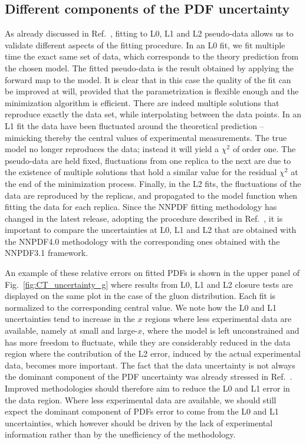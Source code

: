 \subsection{Different components of the PDF uncertainty}

As already discussed in Ref.~\cite{nnpdf30}, fitting to L0, L1 and L2
pseudo-data allows us to validate different aspects of the fitting procedure. In
an L0 fit, we fit multiple time the exact same set of data, which corresponds to
the theory prediction from the chosen model. The fitted pseudo-data is the
result obtained by applying the forward map to the model. It is clear that in
this case the quality of the fit can be improved at will, provided that the
parametrization is flexible enough and the minimization algorithm is efficient.
There are indeed multiple solutions that reproduce exactly the data set, while
interpolating between the data points. In an L1 fit the data have been
fluctuated around the theoretical prediction -- mimicking thereby the central
values of experimental measurements. The true model no longer reproduces the
data; instead it will yield a $\chi^2$ of order one. The pseudo-data are held
fixed, fluctuations from one replica to the next are due to the existence of
multiple solutions that hold a similar value for the residual $\chi^2$ at the
end of the minimization process. Finally, in the L2 fits, the fluctuations of
the data are reproduced by the replicas, and propagated to the model function
when fitting the data for each replica. Since the NNPDF fitting methodology has
changed in the latest release, adopting the procedure described in
Ref.~\cite{Carrazza:2019mzf}, it is important to compare the uncertainties at
L0, L1 and L2 that are obtained with the NNPDF4.0 methodology with the
corresponding ones obtained with the NNPDF3.1 framework.

An example of these relative errors on fitted PDFs is shown in the upper panel of
Fig.~\ref{fig:CT_uncertainty_g} where results from L0, L1 and L2 closure tests
are displayed on the same plot in the case of the gluon distribution. Each fit
is normalized to the corresponding central value. We note how the L0 and L1
uncertainties tend to increase in the $x$ regions where less experimental data
are available, namely at small and large-$x$, where the model is left
unconstrained and has more freedom to fluctuate, while they are considerably
reduced in the data region where the contribution of the L2 error, induced by
the actual experimental data, becomes more important. The fact that the data
uncertainty is not always the dominant component of the PDF uncertainty was
already stressed in Ref.~\cite{nnpdf30}. Improved methodologies should therefore
aim to reduce the L0 and L1 error in the data region. Where 
less experimental data are available, we should still expect the dominant component 
of PDFs error to come from the L0 and L1 uncertainties, which however
should be driven by the lack of experimental information rather than by 
the unefficiency of the methodology.

